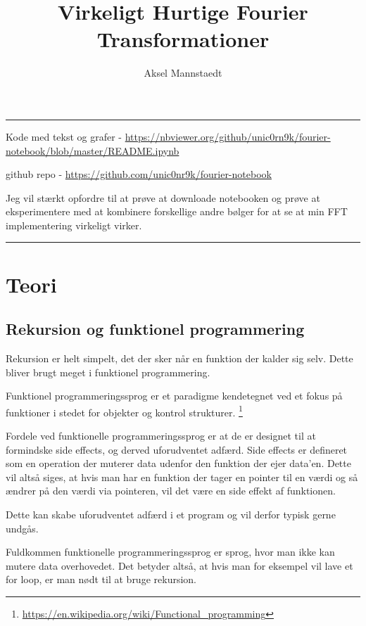 \documentclass[11pt,a4paper]{article}
\author{Aksel Mannstaedt}
\date{}
\title{Virkeligt Hurtige Fourier Transformationer}
\begin{document}
\maketitle
\noindent\rule{\textwidth}{0.5pt}
Kode med tekst og grafer - \url{https://nbviewer.org/github/unic0rn9k/fourier-notebook/blob/master/README.ipynb}

github repo - \url{https://github.com/unic0nr9k/fourier-notebook}

\bigskip

Jeg vil stærkt opfordre til at prøve at downloade notebooken og prøve at eksperimentere med at kombinere forskellige andre bølger for at se at min FFT implementering virkeligt virker.

\noindent\rule{\textwidth}{0.5pt}

\setcounter{tocdepth}{2}
\tableofcontents

\newpage

\section{Teori}
\label{sec:org48f2607}
\subsection{Rekursion og funktionel programmering}
\label{sec:org49aefbc}

Rekursion er helt simpelt, det der sker når en funktion der kalder sig selv.
Dette bliver brugt meget i funktionel programmering.

Funktionel programmeringssprog er et paradigme kendetegnet ved
et fokus på funktioner i stedet for objekter og kontrol strukturer. \footnote{\url{https://en.wikipedia.org/wiki/Functional\_programming}}

\bigskip

Fordele ved funktionelle programmeringssprog er at de er designet til at formindske side effects,
og derved uforudventet adfærd.
Side effects er defineret som en operation der muterer data udenfor den funktion der ejer data'en.
Dette vil altså siges, at hvis man har en funktion der tager en pointer til en værdi og så ændrer på
den værdi via pointeren, vil det være en side effekt af funktionen.

Dette kan skabe uforudventet adfærd i et program og vil derfor typisk gerne undgås.

Fuldkommen funktionelle programmeringssprog er sprog, hvor man ikke kan mutere data overhovedet.
Det betyder altså, at hvis man for eksempel vil lave et for loop, er man nødt til at bruge rekursion.
\end{document}
